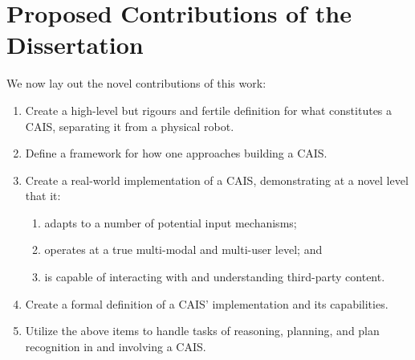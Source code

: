 \section{Proposed Contributions of the Dissertation}

We now lay out the novel contributions of this work:

\begin{enumerate}
\item Create a high-level but rigours and fertile definition for what
  constitutes a CAIS, separating it from a physical robot.
\item Define a framework for how one approaches building a CAIS.
\item Create a real-world implementation of a CAIS, demonstrating at a
  novel level that it:
        \begin{enumerate}
            \item adapts to a number of potential input mechanisms;
            \item operates at a true multi-modal and multi-user level; and
            \item is capable of interacting with and understanding
              third-party content.
        \end{enumerate}
      \item Create a formal definition of a CAIS' implementation and
        its capabilities.
      \item Utilize the above items to handle tasks of reasoning,
        planning, and plan recognition in and involving a CAIS.
\end{enumerate}